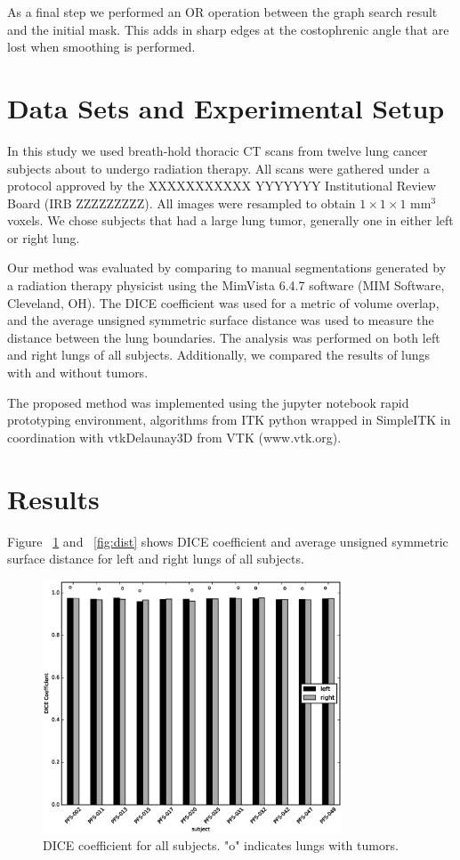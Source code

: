 \documentclass{llncs}
\begin{document}
As a final step we performed an OR operation between the graph search result and the initial mask. This adds in sharp edges at the costophrenic angle that are lost when smoothing is performed.
 

%
\section{Data Sets and Experimental Setup}
%
In this study we used breath-hold thoracic CT scans from twelve lung cancer subjects about to undergo radiation therapy. All scans were gathered under a protocol approved by the 
XXXXXXXXXXX YYYYYYY 
Institutional Review Board 
(IRB ZZZZZZZZZ).
All images were resampled to obtain $1\times{}1\times{}1$ mm$^3$ voxels. We chose subjects that had a large lung tumor, generally one in either left or right lung.

Our method was evaluated by comparing to manual segmentations generated by a radiation therapy physicist using the MimVista 6.4.7 software (MIM Software, Cleveland, OH). The DICE coefficient was used for a metric of volume overlap, and the average unsigned symmetric surface distance was used to measure the distance between the lung boundaries. The analysis was performed on both left and right lungs of all subjects. Additionally, we compared the results of lungs with and without tumors.


The proposed method was implemented using the jupyter notebook \cite{PER-GRA:2007} rapid prototyping environment,  algorithms from ITK\cite{johnson2015itk} python wrapped in SimpleITK \cite{10.3389/fninf.2013.00045} in coordination with vtkDelaunay3D from VTK (www.vtk.org).


%
\section{Results}
%
Figure ~\ref{fig:dice} and ~\ref{fig:dist} shows DICE coefficient and average unsigned symmetric surface distance for left and right lungs of all subjects.
\begin{figure}[t]
  \centering
    \includegraphics[width=3.5in]{figs/dice}
  \caption{DICE coefficient for all subjects. "o" indicates lungs with tumors.}
  \label{fig:dice}
\end{figure}
\end{document}
